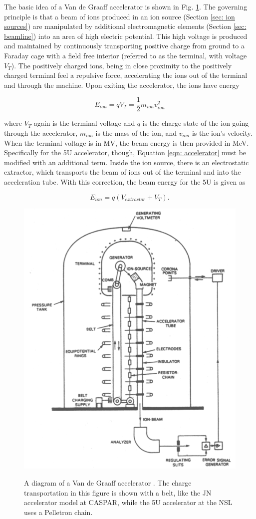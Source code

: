 The basic idea of a Van de Graaff accelerator is shown in Fig. \ref{fig: vdg principles}. The governing principle is that a beam of ions produced in an ion source (Section \ref{sec: ion sources}) are manipulated by additional electromagnetic elements (Section \ref{sec: beamline}) into an area of high electric potential. This high voltage is produced and maintained by continuously transporting positive charge from ground to a Faraday cage with a field free interior (referred to as the terminal, with voltage $V_{T}$). The positively charged ions, being in close proximity to the positively charged terminal feel a repulsive force, accelerating the ions out of the terminal and through the machine. Upon exiting the accelerator, the ions have energy

\begin{equation}
E_{ion} = qV_{T} = \dfrac{1}{2} m_{ion} v_{ion}^{2}
\label{eqn: accelerator}
\end{equation}

\noindent where $V_{T}$ again is the terminal voltage and $q$ is the charge state of the ion going through the accelerator, $m_{ion}$ is the mass of the ion, and $v_{ion}$ is the ion's velocity. When the terminal voltage is in MV, the beam energy is then provided in MeV. Specifically for the 5U accelerator, though, Equation \ref{eqn: accelerator} must be modified with an additional term. Inside the ion source, there is an electrostatic extractor, which transports the beam of ions out of the terminal and into the acceleration tube. With this correction, the beam energy for the 5U is given as

\begin{equation}
E_{ion} = q(V_{extractor} + V_{T}).
\label{eqn: beam energy}
\end{equation}

\begin{figure}
\centering
\includegraphics[width=0.5\linewidth]{figures/vdgDiagram.png}
\label{fig: vdg principles}
\caption{A diagram of a Van de Graaff accelerator \cite{RolfsBook}. The charge transportation in this figure is shown with a belt, like the JN accelerator model at CASPAR, while the 5U accelerator at the NSL uses a Pelletron chain. }
\end{figure}

